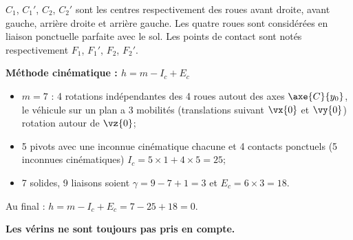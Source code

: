 $C_1$, $C_1'$, $C_2$, $C_2'$ sont les centres respectivement des roues avant droite, avant gauche, arrière droite 
et arrière gauche. Les quatre roues sont considérées en liaison ponctuelle parfaite avec le sol. Les 
points de contact sont notés respectivement $F_1$, $F_1'$, $F_2$, $F_2'$. 
\fi




\ifprof
\begin{corrige}
\textbf{Méthode cinématique : $h = m - I_c + E_c$}
\begin{itemize}
\item $m=7$ : 4 rotations indépendantes des 4 roues autout des axes $\axe{C}{y_0}$, le véhicule sur un plan a 3 mobilités (translations suivant $\vx{0}$ et $\vy{0}$) rotation autour de $\vz{0}$;
\item 5 pivots avec une inconnue cinématique chacune et 4 contacts ponctuels (5 inconnues cinématiques) $I_c = 5\times 1 + 4\times 5 = 25$;
\item 7 solides, 9 liaisons soient $\gamma = 9-7+1 = 3$ et $E_c = 6\times 3 = 18$.
\end{itemize}
Au final : $h = m - I_c + E_c= 7 - 25 + 18 = 0$.
\end{corrige}
\else\fi

\textbf{Les vérins ne sont toujours pas pris en compte.}

